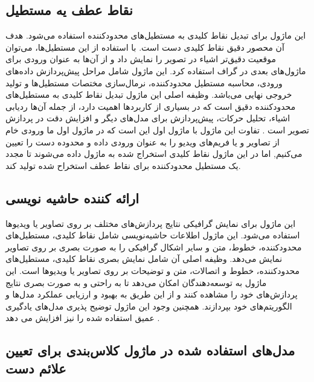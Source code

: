 \subsection{نقاط عطف یه مستطیل\protect{}}
این ماژول برای تبدیل نقاط کلیدی به مستطیل‌های محدودکننده استفاده می‌شود. هدف آن محصور دقیق نقاط کلیدی دست است. با استفاده از این مستطیل‌ها، می‌توان موقعیت دقیق‌تر اشیاء در 
تصویر را نمایش داد و از آن‌ها به عنوان ورودی برای ماژول‌های بعدی در گراف استفاده کرد. این ماژول شامل مراحل پیش‌پردازش داده‌های ورودی، محاسبه مستطیل محدودکننده، نرمال‌سازی مختصات مستطیل‌ها و تولید خروجی نهایی 
 می‌باشد. وظیفه اصلی این ماژول تبدیل نقاط کلیدی به مستطیل‌های محدودکننده دقیق است که در بسیاری از کاربردها اهمیت دارد، از جمله آن‌ها ردیابی اشیاء، تحلیل حرکات، پیش‌پردازش برای مدل‌های دیگر و افزایش دقت در پردازش تصویر است \cite{zhang2020mediapipe}.
تفاوت این ماژول با ماژول اول این است که در ماژول اول ما ورودی خام از تصاویر و یا فریم‌های ویدیو را به عنوان ورودی داده و محدوده دست را تعیین ‌می‌کنیم, اما در 
این ماژول نقاط کلیدی استخراج شده به ماژول داده می‌شوند تا مجدد یک مستطیل محدودکننده برای نقاط عطف استخراح شده تولید کند.

\subsection{ارائه کننده حاشیه نویسی\protect{}}
این ماژول برای نمایش گرافیکی نتایج پردازش‌های مختلف بر روی تصاویر یا ویدیوها استفاده می‌شود. این ماژول اطلاعات حاشیه‌نویسی شامل نقاط کلیدی، مستطیل‌های محدودکننده، خطوط، متن و سایر اشکال گرافیکی را به صورت 
بصری بر روی تصاویر نمایش می‌دهد. وظیفه اصلی آن شامل نمایش بصری نقاط کلیدی، مستطیل‌های محدودکننده، خطوط و اتصالات، متن و توضیحات بر روی تصاویر یا ویدیوها است. این ماژول به توسعه‌دهندگان امکان 
می‌دهد تا به راحتی و به صورت بصری نتایج پردازش‌های خود را مشاهده کنند و از این طریق به بهبود و ارزیابی عملکرد مدل‌ها و الگوریتم‌های خود بپردازند.
همچنین وجود این ماژول توضیح پذیری مدل‌های یادگیری عمیق استفاده شده را نیز افزایش می دهد
\cite{zhang2020mediapipe}.

\subsection{مدل‌های استفاده شده در ماژول کلاس‌بندی برای تعیین علائم دست}

